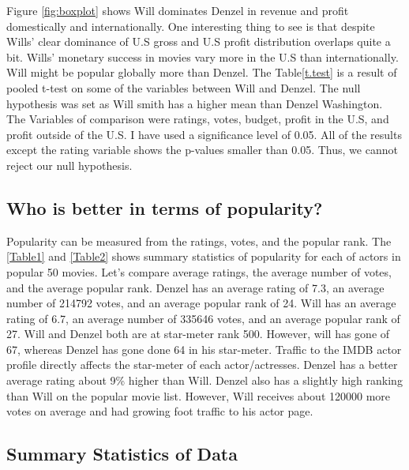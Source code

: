 \documentclass[]{article}
\begin{document}
\noindent Figure \ref{fig:boxplot} shows Will dominates Denzel in
revenue and profit domestically and internationally. One interesting
thing to see is that despite Wills' clear dominance of U.S gross and U.S
profit distribution overlaps quite a bit. Wills' monetary success in
movies vary more in the U.S than internationally. Will might be popular
globally more than Denzel. The Table\ref{t.test} is a result of pooled
t-test on some of the variables between Will and Denzel. The null
hypothesis was set as Will smith has a higher mean than Denzel
Washington. The Variables of comparison were ratings, votes, budget,
profit in the U.S, and profit outside of the U.S. I have used a
significance level of 0.05. All of the results except the rating
variable shows the p-values smaller than 0.05. Thus, we cannot reject
our null hypothesis.\vspace{0.25in}

\subsection{Who is better in terms of popularity?}
\label{sec:rq2}

\noindent Popularity can be measured from the ratings, votes, and the
popular rank. The \ref{Table1} and \ref{Table2} shows summary statistics
of popularity for each of actors in popular 50 movies. Let's compare
average ratings, the average number of votes, and the average popular
rank. Denzel has an average rating of 7.3, an average number of 214792
votes, and an average popular rank of 24. Will has an average rating of
6.7, an average number of 335646 votes, and an average popular rank of
27. Will and Denzel both are at star-meter rank 500. However, will has
gone of 67, whereas Denzel has gone done 64 in his star-meter. Traffic
to the IMDB actor profile directly affects the star-meter of each
actor/actresses. Denzel has a better average rating about 9\% higher
than Will. Denzel also has a slightly high ranking than Will on the
popular movie list. However, Will receives about 120000 more votes on
average and had growing foot traffic to his actor page.\vspace{0.25in}

\subsection{Summary Statistics of Data}
\label{sec:data-summary}



\end{document}
